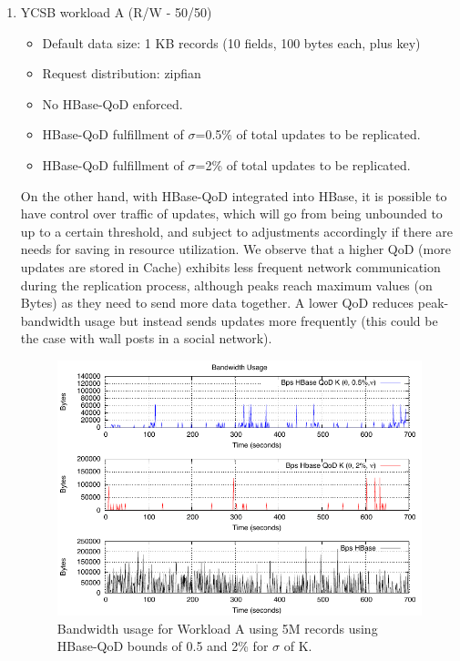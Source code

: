 \begin{enumerate}
\item{YCSB workload A (R/W - 50/50)}
	\begin{itemize}
	Read/update ratio: 50/50
	\item Default data size: 1 KB records (10 fields, 100 bytes each, plus key)
	\item Request distribution: zipfian
	\item No HBase-QoD enforced.
	\item HBase-QoD fulfillment of $\sigma$=0.5\% of total updates to be replicated.
	\item HBase-QoD fulfillment of $\sigma$=2\% of total updates to be replicated.
	\end{itemize}

On the other hand, with HBase-QoD integrated into HBase, it is possible to have control over traffic of updates, which will go from being unbounded to up to a certain threshold, and subject to adjustments accordingly if there are needs for saving in resource utilization. We observe that a higher QoD (more updates are stored in Cache) exhibits less frequent network communication during the replication process, although peaks reach maximum values (on Bytes) as they need to send more data together. A lower QoD reduces peak-bandwidth usage but instead sends updates more frequently (this could be the case with wall posts in a social network).

\begin{figure}
\centering
\includegraphics[scale=1.3]{figs/plot-packets-size-workloada-allbounds-latest.pdf}
\caption{Bandwidth usage for Workload A using 5M records using HBase-QoD bounds of 0.5 and 2\% for $\sigma$ of K.}
\label{fig-bandwidth-worloada}
\end{figure}


\end{enumerate}
